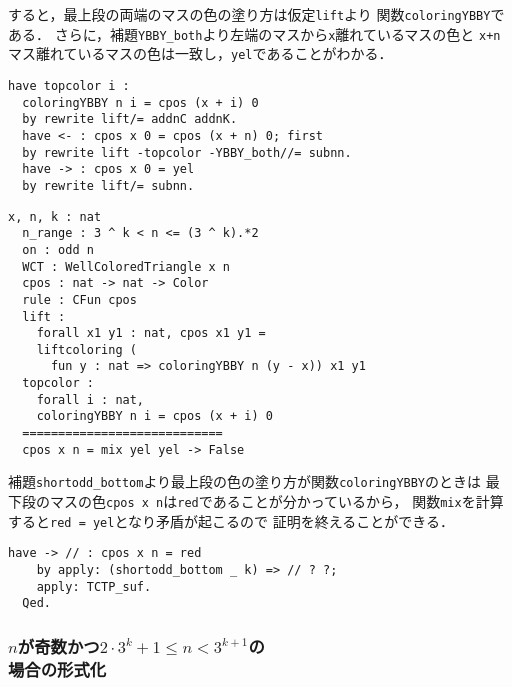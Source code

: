 すると，最上段の両端のマスの色の塗り方は仮定{\tt{lift}}より
関数{\tt{coloringYBBY}}である．
さらに，補題{\tt{YBBY\_both}}より左端のマスから{\tt{x}}離れているマスの色と
{\tt{x+n}}マス離れているマスの色は一致し，{\tt{yel}}であることがわかる．
\begin{lstlisting}[language=Coq]
  have topcolor i :
  coloringYBBY n i = cpos (x + i) 0
  by rewrite lift/= addnC addnK.
  have <- : cpos x 0 = cpos (x + n) 0; first
  by rewrite lift -topcolor -YBBY_both//= subnn.
  have -> : cpos x 0 = yel
  by rewrite lift/= subnn.
\end{lstlisting}
\begin{lstlisting}[language=Coq]
  x, n, k : nat
  n_range : 3 ^ k < n <= (3 ^ k).*2
  on : odd n
  WCT : WellColoredTriangle x n
  cpos : nat -> nat -> Color
  rule : CFun cpos
  lift :
    forall x1 y1 : nat, cpos x1 y1 =
    liftcoloring (
      fun y : nat => coloringYBBY n (y - x)) x1 y1
  topcolor :
    forall i : nat,
    coloringYBBY n i = cpos (x + i) 0
  ============================
  cpos x n = mix yel yel -> False
\end{lstlisting}
補題{\tt{shortodd\_bottom}}より最上段の色の塗り方が関数{\tt{coloringYBBY}}のときは
最下段のマスの色{\tt{cpos x n}}は{\tt{red}}であることが分かっているから，
関数{\tt{mix}}を計算すると{\tt{red = yel}}となり矛盾が起こるので
証明を終えることができる．
\begin{lstlisting}[language=Coq]
    have -> // : cpos x n = red
    by apply: (shortodd_bottom _ k) => // ? ?;
    apply: TCTP_suf.
  Qed.
\end{lstlisting}

\subsubsection{$n$が奇数かつ$2 \cdot 3^{k} + 1 \leq n < 3^{k+1}$の\\場合の形式化}

